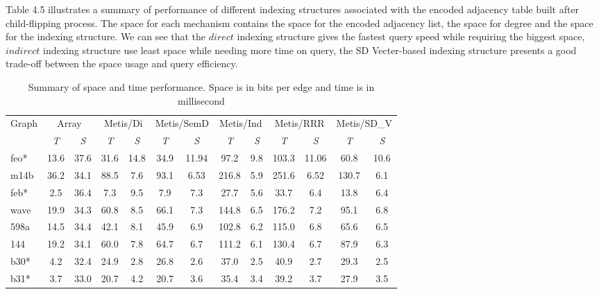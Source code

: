\documentclass[12pt,glossary]{dalthesis}
\begin{document}
\bigskip

Table 4.5 illustrates a summary of performance of different indexing structures associated with the encoded adjacency table built after child-flipping process. The space for each mechanism contains the space for the encoded adjacency list, the space for degree and the space for the indexing structure. We can see that the $direct$ indexing structure gives the fastest query speed while requiring the biggest space, $indirect$ indexing structure use least space while needing more time on query, the SD Vecter-based indexing structure presents a good trade-off between the space usage and query efficiency. 


\begin{table}[ht]
\centering
\caption{Summary of space and time performance. Space is in bits per edge and time is in millisecond}
\label{my-label}
\begin{tabular}{|l||c|c||c|c||c|c||c|c||c|c||c|c|}
\hline
\multirow{2}{*}{Graph} & \multicolumn{2}{c||}{Array} & \multicolumn{2}{c||}{Metis/Di} & \multicolumn{2}{c||}{Metis/SemD} & \multicolumn{2}{c||}{Metis/Ind} & \multicolumn{2}{c||}{Metis/RRR} & \multicolumn{2}{c|}{Metis/SD\_V} \\ \cline{2-13}
                       & \textit{T}        & \textit{S}       & \textit{T}           & \textit{S}           & \textit{T} & \textit{S}          & \textit{T}            & \textit{S}           & \textit{T}          & \textit{S}        & \textit{T} & \textit{S} \\ \hline
feo*          & 13.6  & 37.6   &  31.6  &  14.8  &  34.9   &   11.94  &  97.2  &  9.8  &  103.3  &  11.06  &  60.8  &  10.6              \\
m14b          & 36.2  & 34.1   &  88.5  &  7.6  &  93.1   &  6.53   &  216.8  &  5.9  &  251.6  &  6.52  &  130.7  &   6.1             \\
feb*          & 2.5   & 36.4   &  7.3   &  9.5  &  7.9   &  7.3   &  27.7  &  5.6  &  33.7  &  6.4  &  13.8  &  6.4              \\
wave          & 19.9  & 34.3   &  60.8  &  8.5  &  66.1   &  7.3   &  144.8  &  6.5  &  176.2  &  7.2  &  95.1  &  6.8              \\
598a          & 14.5  & 34.4   &  42.1  &  8.1   &  45.9   &  6.9   &  102.8  &  6.2  &  115.0  &  6.8  &  65.6  &  6.5              \\
144           & 19.2  & 34.1   & 60.0   &  7.8  &   64.7  &  6.7   &  111.2  &  6.1  &  130.4   &  6.7  &  87.9  &  6.3              \\
b30*          & 4.2   & 32.4   &  24.9  &  2.8  &  26.8   &  2.6   &  37.0  &  2.5  &  40.9  &  2.7  &  29.3  &   2.5             \\ 
b31*          & 3.7   &  33.0  &  20.7  &  4.2  &   20.7  &   3.6  &  35.4  &  3.4  &  39.2  &  3.7  &  27.9  &   3.5             \\ \hline


\end{tabular}
\end{table}
\end{document}
